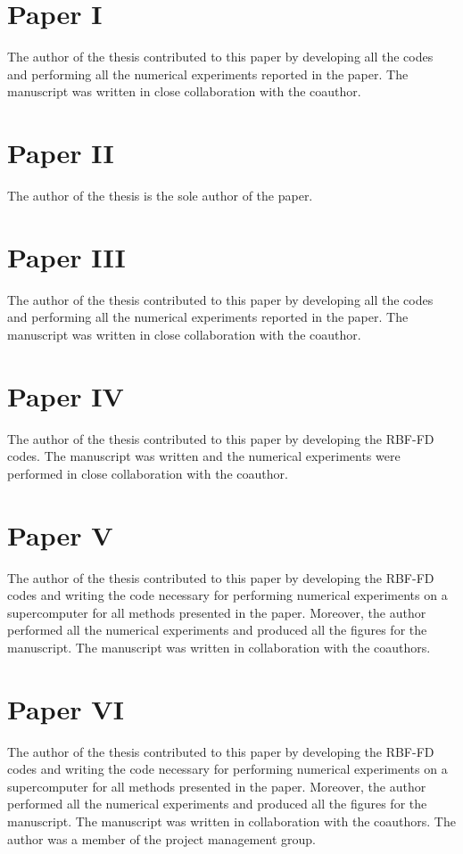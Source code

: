\documentclass{UUThesisTemplate}
\begin{document}
%
\section*{Paper I}
The author of the thesis contributed to this paper by developing all the codes and performing all the numerical experiments reported in the paper. The manuscript was written in close collaboration with the coauthor. 




%
\section*{Paper II}
The author of the thesis is the sole author of the paper.



%
\section*{Paper III}
The author of the thesis contributed to this paper by developing all the codes and performing all the numerical experiments reported in the paper. The manuscript was written in close collaboration with the coauthor. 




%
\section*{Paper IV}
The author of the thesis contributed to this paper by developing the RBF-FD codes. The manuscript was written and the numerical experiments were performed in close collaboration with the coauthor. 



%
\newpage
\section*{Paper V}
The author of the thesis contributed to this paper by developing the RBF-FD codes and writing the code necessary for performing numerical experiments on a supercomputer for all methods presented in the paper. Moreover, the author performed all the numerical experiments and produced all the figures for the manuscript. The manuscript was written in collaboration with the coauthors. 





%
\section*{Paper VI}
The author of the thesis contributed to this paper by developing the RBF-FD codes and writing the code necessary for performing numerical experiments on a supercomputer for all methods presented in the paper. Moreover, the author performed all the numerical experiments and produced all the figures for the manuscript. The manuscript was written in collaboration with the coauthors. The author was a member of the project management group.\\\\
\end{document}
